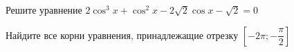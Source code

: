 \begin{ex}
	\begin{condition}
		\begin{enumcols}[label=\asbuk*)]
			\item Решите уравнение \( 2\cos^3 x +\cos^2 x -2\sqrt{2}\cos x - \sqrt{2} = 0 \)
			\item Найдите все корни уравнения, принадлежащие отрезку \( \left[-2\pi;-\dfrac{\pi}{2}\right] \)
		\end{enumcols}
	\end{condition}
\end{ex}